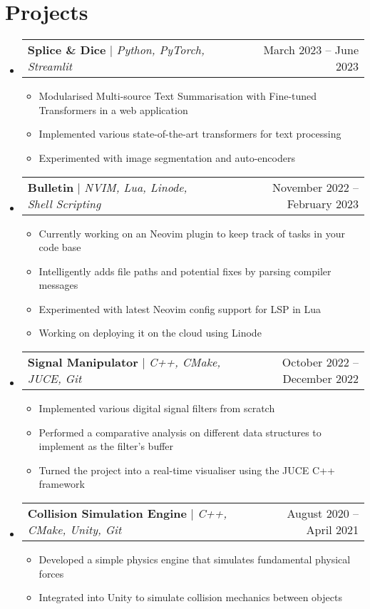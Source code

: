 \documentclass[letterpaper,11pt]{article}
\makeatletter
\newcommand{\resumeItem}[1]{
  \item\small{
    {#1 \vspace{-2pt}}
  }
}
\newcommand{\resumeProjectHeading}[2]{
    \item
    \begin{tabular*}{0.97\textwidth}{l@{\extracolsep{\fill}}r}
      \small#1 & #2 \\
    \end{tabular*}\vspace{-7pt}
}
\newcommand{\resumeSubHeadingListStart}{\begin{itemize}[leftmargin=0.15in, label={}]}
\newcommand{\resumeSubHeadingListEnd}{\end{itemize}}
\newcommand{\resumeItemListStart}{\begin{itemize}}
\newcommand{\resumeItemListEnd}{\end{itemize}\vspace{-5pt}}
\makeatother
\begin{document}
\section{Projects}
    \resumeSubHeadingListStart

    \resumeProjectHeading
          {\textbf{Splice \& Dice} $|$ \emph{Python, PyTorch, Streamlit}}{March 2023 -- June 2023}
          \resumeItemListStart
            \resumeItem{Modularised Multi-source Text Summarisation with Fine-tuned Transformers in a web application}
            \resumeItem{Implemented various state-of-the-art transformers for text processing}
            \resumeItem{Experimented with image segmentation and auto-encoders}
          \resumeItemListEnd

    \resumeProjectHeading
          {\textbf{Bulletin} $|$ \emph{NVIM, Lua, Linode, Shell Scripting}}{November 2022 -- February 2023}
          \resumeItemListStart
            \resumeItem{Currently working on an Neovim plugin to keep track of tasks in your code base}
            \resumeItem{Intelligently adds file paths and potential fixes by parsing compiler messages}
            \resumeItem{Experimented with latest Neovim config support for LSP in Lua}
            \resumeItem{Working on deploying it on the cloud using Linode}
          \resumeItemListEnd

    \resumeProjectHeading
          {\textbf{Signal Manipulator} $|$ \emph{C++, CMake, JUCE, Git}}{October 2022 -- December 2022}
          \resumeItemListStart
            \resumeItem{Implemented various digital signal filters from scratch}
            \resumeItem{Performed a comparative analysis on different data structures to implement as the filter’s buffer}
            \resumeItem{Turned the project into a real-time visualiser using the JUCE C++ framework}
          \resumeItemListEnd

      \resumeProjectHeading
          {\textbf{Collision Simulation Engine} $|$ \emph{C++, CMake, Unity, Git}}{August 2020 -- April 2021}
          \resumeItemListStart
            \resumeItem{Developed a simple physics engine that simulates fundamental physical forces}
            \resumeItem{Integrated into Unity to simulate collision mechanics between objects}
          \resumeItemListEnd

    \resumeSubHeadingListEnd



%
\end{document}
